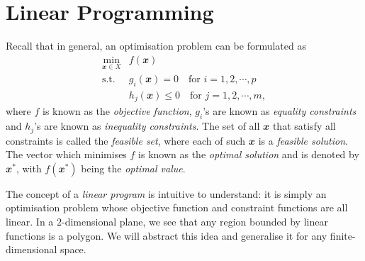 \documentclass[math, code]{amznotes}
\theoremstyle{remark}
\begin{document}
\tableofcontents

\chapter{Linear Programming}
Recall that in general, an optimisation problem can be formulated as
\begin{align*}
    \min_{\mathbfit{x} \in X} & f(\mathbfit{x}) \\
    \textrm{s.t. } & g_i(\mathbfit{x}) = 0 \quad \textrm{for } i = 1, 2, \cdots, p \\
    & h_j(\mathbfit{x}) \leq 0 \quad \textrm{for } j = 1, 2, \cdots, m,
\end{align*}
where $f$ is known as the \textit{objective function}, $g_i$'s are known as \textit{equality constraints} and $h_j$'s are known as \textit{inequality constraints}. The set of all $\mathbfit{x}$ that satisfy all constraints is called the \textit{feasible set}, where each of such $\mathbfit{x}$ is a \textit{feasible solution}. The vector which minimises $f$ is known as the \textit{optimal solution} and is denoted by $\mathbfit{x}^*$, with $f(\mathbfit{x}^*)$ being the \textit{optimal value}.

The concept of a \textit{linear program} is intuitive to understand: it is simply an optimisation problem whose objective function and constraint functions are all linear. In a $2$-dimensional plane, we see that any region bounded by linear functions is a polygon. We will abstract this idea and generalise it for any finite-dimensional space.
\end{document}
